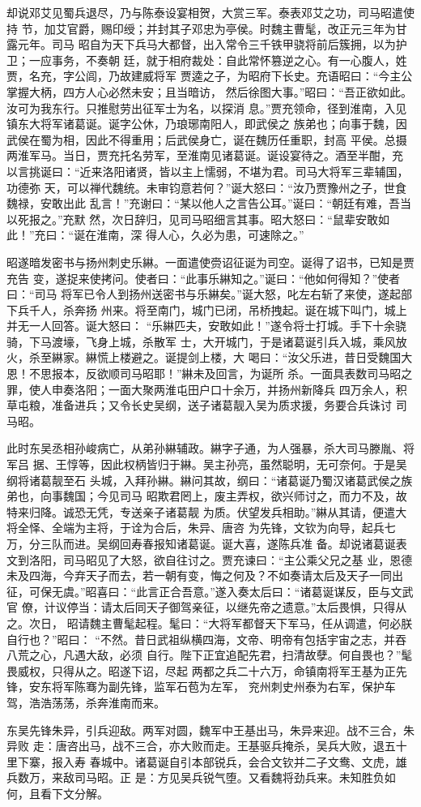 却说邓艾见蜀兵退尽，乃与陈泰设宴相贺，大赏三军。泰表邓艾之功，司马昭遣使持
节，加艾官爵，赐印绶；并封其子邓忠为亭侯。时魏主曹髦，改正元三年为甘露元年。司马
昭自为天下兵马大都督，出入常令三千铁甲骁将前后簇拥，以为护卫；一应事务，不奏朝
廷，就于相府裁处：自此常怀篡逆之心。有一心腹人，姓贾，名充，字公闾，乃故建威将军
贾逵之子，为昭府下长史。充语昭曰：“今主公掌握大柄，四方人心必然未安；且当暗访，
然后徐图大事。”昭曰：“吾正欲如此。汝可为我东行。只推慰劳出征军士为名，以探消
息。”贾充领命，径到淮南，入见镇东大将军诸葛诞。诞字公休，乃琅琊南阳人，即武侯之
族弟也；向事于魏，因武侯在蜀为相，因此不得重用；后武侯身亡，诞在魏历任重职，封高
平侯。总摄两淮军马。当日，贾充托名劳军，至淮南见诸葛诞。诞设宴待之。酒至半酣，充
以言挑诞曰：“近来洛阳诸贤，皆以主上懦弱，不堪为君。司马大将军三辈辅国，功德弥
天，可以禅代魏统。未审钧意若何？”诞大怒曰：“汝乃贾豫州之子，世食魏禄，安敢出此
乱言！”充谢曰：“某以他人之言告公耳。”诞曰：“朝廷有难，吾当以死报之。”充默
然，次日辞归，见司马昭细言其事。昭大怒曰：“鼠辈安敢如此！”充曰：“诞在淮南，深
得人心，久必为患，可速除之。”

昭遂暗发密书与扬州刺史乐綝。一面遣使赍诏征诞为司空。诞得了诏书，已知是贾充告
变，遂捉来使拷问。使者曰：“此事乐綝知之。”诞曰：“他如何得知？”使者曰：“司马
将军已令人到扬州送密书与乐綝矣。”诞大怒，叱左右斩了来使，遂起部下兵千人，杀奔扬
州来。将至南门，城门已闭，吊桥拽起。诞在城下叫门，城上并无一人回答。诞大怒曰：
“乐綝匹夫，安敢如此！”遂令将士打城。手下十余骁骑，下马渡壕，飞身上城，杀散军
士，大开城门，于是诸葛诞引兵入城，乘风放火，杀至綝家。綝慌上楼避之。诞提剑上楼，大
喝曰：“汝父乐进，昔日受魏国大恩！不思报本，反欲顺司马昭耶！”綝未及回言，为诞所
杀。一面具表数司马昭之罪，使人申奏洛阳；一面大聚两淮屯田户口十余万，并扬州新降兵
四万余人，积草屯粮，准备进兵；又令长史吴纲，送子诸葛靓入吴为质求援，务要合兵诛讨
司马昭。

此时东吴丞相孙峻病亡，从弟孙綝辅政。綝字子通，为人强暴，杀大司马滕胤、将军吕
据、王惇等，因此权柄皆归于綝。吴主孙亮，虽然聪明，无可奈何。于是吴纲将诸葛靓至石
头城，入拜孙綝。綝问其故，纲曰：“诸葛诞乃蜀汉诸葛武侯之族弟也，向事魏国；今见司马
昭欺君罔上，废主弄权，欲兴师讨之，而力不及，故特来归降。诚恐无凭，专送亲子诸葛靓
为质。伏望发兵相助。”綝从其请，便遣大将全怿、全端为主将，于诠为合后，朱异、唐咨
为先锋，文钦为向导，起兵七万，分三队而进。吴纲回寿春报知诸葛诞。诞大喜，遂陈兵准
备。却说诸葛诞表文到洛阳，司马昭见了大怒，欲自往讨之。贾充谏曰：“主公乘父兄之基
业，恩德未及四海，今弃天子而去，若一朝有变，悔之何及？不如奏请太后及天子一同出
征，可保无虞。”昭喜曰：“此言正合吾意。”遂入奏太后曰：“诸葛诞谋反，臣与文武官
僚，计议停当：请太后同天子御驾亲征，以继先帝之遗意。”太后畏惧，只得从之。次日，
昭请魏主曹髦起程。髦曰：“大将军都督天下军马，任从调遣，何必朕自行也？”昭曰：
“不然。昔日武祖纵横四海，文帝、明帝有包括宇宙之志，并吞八荒之心，凡遇大敌，必须
自行。陛下正宜追配先君，扫清故孽。何自畏也？”髦畏威权，只得从之。昭遂下诏，尽起
两都之兵二十六万，命镇南将军王基为正先锋，安东将军陈骞为副先锋，监军石苞为左军，
兖州刺史州泰为右军，保护车驾，浩浩荡荡，杀奔淮南而来。

东吴先锋朱异，引兵迎敌。两军对圆，魏军中王基出马，朱异来迎。战不三合，朱异败
走：唐咨出马，战不三合，亦大败而走。王基驱兵掩杀，吴兵大败，退五十里下寨，报入寿
春城中。诸葛诞自引本部锐兵，会合文钦并二子文鸯、文虎，雄兵数万，来敌司马昭。正
是：方见吴兵锐气堕。又看魏将劲兵来。未知胜负如何，且看下文分解。